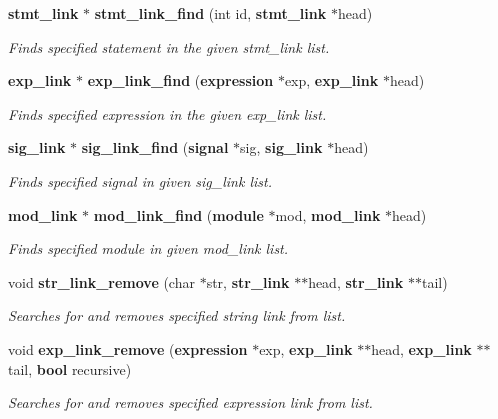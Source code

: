 \begin{CompactItemize}
{\bf stmt\_\-link} $\ast$ {\bf stmt\_\-link\_\-find} (int id, {\bf stmt\_\-link} $\ast$head)
\begin{CompactList}\small\item\em Finds specified statement in the given stmt\_\-link list.\item\end{CompactList}\item 
{\bf exp\_\-link} $\ast$ {\bf exp\_\-link\_\-find} ({\bf expression} $\ast$exp, {\bf exp\_\-link} $\ast$head)
\begin{CompactList}\small\item\em Finds specified expression in the given exp\_\-link list.\item\end{CompactList}\item 
{\bf sig\_\-link} $\ast$ {\bf sig\_\-link\_\-find} ({\bf signal} $\ast$sig, {\bf sig\_\-link} $\ast$head)
\begin{CompactList}\small\item\em Finds specified signal in given sig\_\-link list.\item\end{CompactList}\item 
{\bf mod\_\-link} $\ast$ {\bf mod\_\-link\_\-find} ({\bf module} $\ast$mod, {\bf mod\_\-link} $\ast$head)
\begin{CompactList}\small\item\em Finds specified module in given mod\_\-link list.\item\end{CompactList}\item 
void {\bf str\_\-link\_\-remove} (char $\ast$str, {\bf str\_\-link} $\ast$$\ast$head, {\bf str\_\-link} $\ast$$\ast$tail)
\begin{CompactList}\small\item\em Searches for and removes specified string link from list.\item\end{CompactList}\item 
void {\bf exp\_\-link\_\-remove} ({\bf expression} $\ast$exp, {\bf exp\_\-link} $\ast$$\ast$head, {\bf exp\_\-link} $\ast$$\ast$tail, {\bf bool} recursive)
\begin{CompactList}\small\item\em Searches for and removes specified expression link from list.\item\end{CompactList}\item 

\end{CompactItemize}
